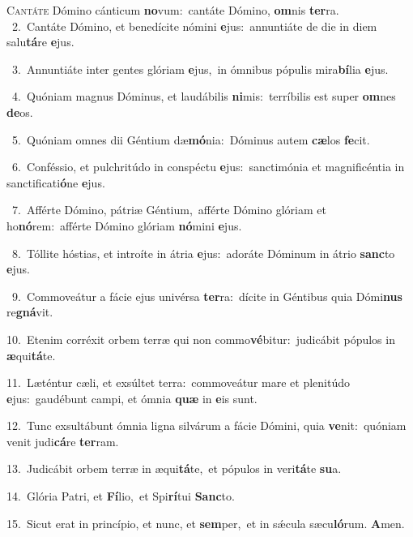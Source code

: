 \lettrine{\initial\textcolor{\initialcolor}{C}}{antáte} Dómino cánticum \textbf{no}\-vum:~\star cantáte Dómino, \textbf{om}\-nis \textbf{ter}\-ra.\\
{\numbfont\textcolor{\numbcolor}{~2.}}~Cantáte Dómino, et benedícite nómini \textbf{e}\-jus:~\star annuntiáte de die in diem salu\-\textbf{tá}\-re \textbf{e}\-jus.\par
{\numbfont\textcolor{\numbcolor}{~3.}}~Annuntiáte inter gentes glóriam \textbf{e}\-jus,~\star in ómnibus pópulis mira\-\textbf{bí}\-lia \textbf{e}\-jus.\par
{\numbfont\textcolor{\numbcolor}{~4.}}~Quóniam magnus Dóminus, et laudábilis \textbf{ni}\-mis:~\star terríbilis est super \textbf{om}\-nes \textbf{de}\-os.\par
{\numbfont\textcolor{\numbcolor}{~5.}}~Quóniam omnes dii Géntium dæ\-\textbf{mó}\-nia:~\star Dóminus autem \textbf{cæ}\-los \textbf{fe}\-cit.\par
{\numbfont\textcolor{\numbcolor}{~6.}}~Conféssio, et pulchritúdo in conspéctu \textbf{e}\-jus:~\star sanctimónia et magnificéntia in sanctificati\-\textbf{ó}\-ne \textbf{e}\-jus.\par
{\numbfont\textcolor{\numbcolor}{~7.}}~Afférte Dómino, pátriæ Géntium,~\dagger afférte Dómino glóriam et ho\-\textbf{nó}\-rem:~\star afférte Dómino glóriam \textbf{nó}\-mini \textbf{e}\-jus.\par
{\numbfont\textcolor{\numbcolor}{~8.}}~Tóllite hóstias, et introíte in átria \textbf{e}\-jus:~\star adoráte Dóminum in átrio \textbf{sanc}\-to \textbf{e}\-jus.\par
{\numbfont\textcolor{\numbcolor}{~9.}}~Commoveátur a fácie ejus univérsa \textbf{ter}\-ra:~\star dícite in Géntibus quia Dómi\textbf{nus} re\-\textbf{gná}\-vit.\par
{\numbfont\textcolor{\numbcolor}{10.}}~Etenim corréxit orbem terræ qui non commo\-\textbf{vé}\-bitur:~\star judicábit pópulos in \textbf{æ}\-qui\-\textbf{tá}\-te.\par
{\numbfont\textcolor{\numbcolor}{11.}}~Læténtur cæli, et exsúltet terra:~\dagger commoveátur mare et plenitúdo \textbf{e}\-jus:~\star gaudébunt campi, et ómnia \textbf{quæ} in \textbf{e}\-is sunt.\par
{\numbfont\textcolor{\numbcolor}{12.}}~Tunc exsultábunt ómnia ligna silvárum a fácie Dómini, quia \textbf{ve}\-nit:~\star quóniam venit judi\-\textbf{cá}\-re \textbf{ter}\-ram.\par
{\numbfont\textcolor{\numbcolor}{13.}}~Judicábit orbem terræ in æqui\-\textbf{tá}\-te,~\star et pópulos in veri\-\textbf{tá}\-te \textbf{su}\-a.\par
{\numbfont\textcolor{\numbcolor}{14.}}~Glória Patri, et \textbf{Fí}\-lio,~\star et Spi\-\textbf{rí}\-tui \textbf{Sanc}\-to.\par
{\numbfont\textcolor{\numbcolor}{15.}}~Sicut erat in princípio, et nunc, et \textbf{sem}\-per,~\star et in sǽcula sæcu\-\textbf{ló}\-rum. \textbf{A}\-men.\par

